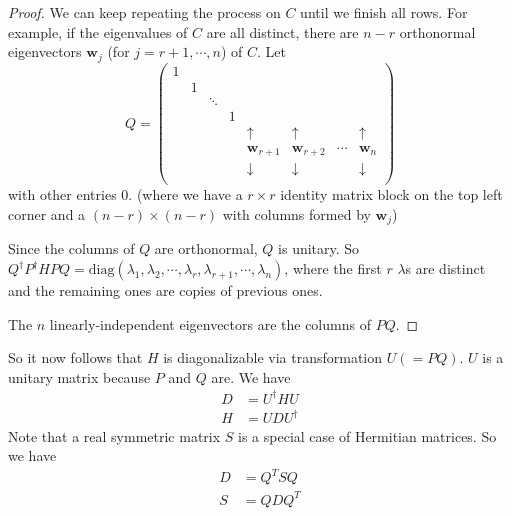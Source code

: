\documentclass[a4paper]{article}
\begin{document}
\begin{proof}
  We can keep repeating the process on $C$ until we finish all rows. For example, if the eigenvalues of $C$ are all distinct, there are $n - r$ orthonormal eigenvectors $\mathbf{w}_j$ (for $j = r + 1, \cdots, n$) of $C$. Let
  \[
    Q =
    \begin{pmatrix}
      1 \\
      & 1\\
      && \ddots\\
      &&& 1\\
      &&&& \uparrow & \uparrow & &\uparrow\\
      &&&& \mathbf{w}_{r+1} & \mathbf{w}_{r + 2} & \cdots & \mathbf{w}_n\\
      &&&& \downarrow & \downarrow & &\downarrow\\
    \end{pmatrix}
  \]
  with other entries $0$. (where we have a $r\times r$ identity matrix block on the top left corner and a $(n - r) \times (n -r)$ with columns formed by $\mathbf{w}_j$)

  Since the columns of $Q$ are orthonormal, $Q$ is unitary. So $Q^\dagger P^\dagger HPQ = \mathrm{diag}(\lambda_1, \lambda_2, \cdots, \lambda_r, \lambda_{r + 1}, \cdots, \lambda_n)$, where the first $r$ $\lambda$s are distinct and the remaining ones are copies of previous ones.

  The $n$ linearly-independent eigenvectors are the columns of $PQ$.

\end{proof}
So it now follows that $H$ is diagonalizable via transformation $U (=PQ)$. $U$ is a unitary matrix because $P$ and $Q$ are. We have
\begin{align*}
  D &= U^\dagger HU\\
  H &= UDU^\dagger
\end{align*}
Note that a real symmetric matrix $S$ is a special case of Hermitian matrices. So we have
\begin{align*}
  D &= Q^T SQ\\
  S &= QDQ^T
\end{align*}
\end{document}
